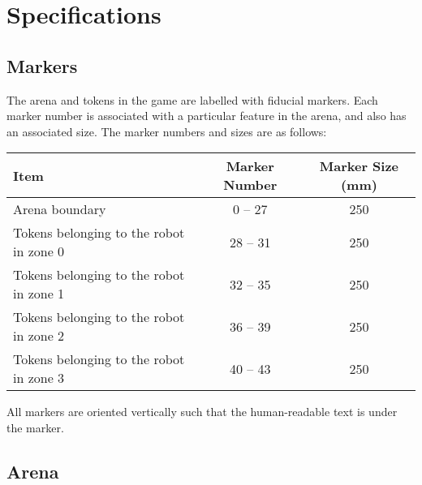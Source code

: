 \section{Specifications}
\label{sec:specs}

\subsection{Markers}
\label{spec:markers}

The arena and tokens in the game are labelled with fiducial
markers. Each marker number is associated with a particular feature in the
arena, and also has an associated size. The marker numbers and sizes are as
follows:

\begin{center}
\begin{tabular}{lcc}
  \toprule
  \textbf{Item} & \textbf{Marker Number} & \textbf{Marker Size (\si{mm})} \\
  \midrule
  Arena boundary & 0 -- 27 & 250 \\
  Tokens belonging to the robot in zone 0 & 28 -- 31 & 250 \\
  Tokens belonging to the robot in zone 1 & 32 -- 35 & 250 \\
  Tokens belonging to the robot in zone 2 & 36 -- 39 & 250 \\
  Tokens belonging to the robot in zone 3 & 40 -- 43 & 250 \\
  \bottomrule
\end{tabular}
\end{center}

All markers are oriented vertically such that the human-readable text
is under the marker.

\subsection{Arena}
\label{spec:arena}

